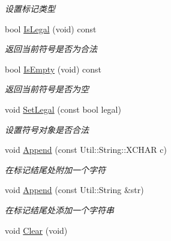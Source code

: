 \begin{DoxyCompactItemize}
\begin{DoxyCompactList}\small\item\em 设置标记类型 \end{DoxyCompactList}\item 
bool \hyperlink{class_lexer_sys_1_1_token_a994ef672b9f5fc0ca1bf78db1d16a0b3}{Is\-Legal} (void) const 
\begin{DoxyCompactList}\small\item\em 返回当前符号是否为合法 \end{DoxyCompactList}\item 
bool \hyperlink{class_lexer_sys_1_1_token_a5e58cc18e4b8ee49fecd2464d4664c03}{Is\-Empty} (void) const 
\begin{DoxyCompactList}\small\item\em 返回当前符号是否为空 \end{DoxyCompactList}\item 
void \hyperlink{class_lexer_sys_1_1_token_a6cede8c1a9179b7de9c98c1bf5e0a42d}{Set\-Legal} (const bool legal)
\begin{DoxyCompactList}\small\item\em 设置符号对象是否合法 \end{DoxyCompactList}\item 
void \hyperlink{class_lexer_sys_1_1_token_ab3755426459c46136881da2ba317f281}{Append} (const Util\-::\-String\-::\-X\-C\-H\-A\-R c)
\begin{DoxyCompactList}\small\item\em 在标记结尾处附加一个字符 \end{DoxyCompactList}\item 
void \hyperlink{class_lexer_sys_1_1_token_a6f43c50ec623e5c9af0e7ba482d1c688}{Append} (const Util\-::\-String \&str)
\begin{DoxyCompactList}\small\item\em 在标记结尾处添加一个字符串 \end{DoxyCompactList}\item 
\hypertarget{class_lexer_sys_1_1_token_a0e4316e6fe6a9367212b78e8c970281c}{void \hyperlink{class_lexer_sys_1_1_token_a0e4316e6fe6a9367212b78e8c970281c}{Clear} (void)}\label{class_lexer_sys_1_1_token_a0e4316e6fe6a9367212b78e8c970281c}


\end{DoxyCompactItemize}
